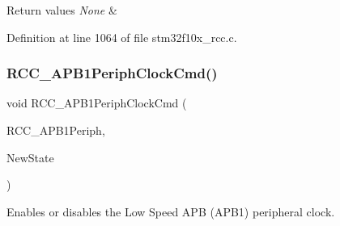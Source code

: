 \begin{DoxyRetVals}{Return values}
{\em None} & \\
\hline
\end{DoxyRetVals}


Definition at line 1064 of file stm32f10x\+\_\+rcc.\+c.

\mbox{\label{group___r_c_c___exported___functions_gaee7cc5d73af7fe1986fceff8afd3973e}} 
\subsubsection{\texorpdfstring{R\+C\+C\+\_\+\+A\+P\+B1\+Periph\+Clock\+Cmd()}{RCC\_APB1PeriphClockCmd()}}
{\footnotesize\ttfamily void R\+C\+C\+\_\+\+A\+P\+B1\+Periph\+Clock\+Cmd (\begin{DoxyParamCaption}\item[{uint32\+\_\+t}]{R\+C\+C\+\_\+\+A\+P\+B1\+Periph,  }\item[{\hyperlink{group___exported__types_gac9a7e9a35d2513ec15c3b537aaa4fba1}{Functional\+State}}]{New\+State }\end{DoxyParamCaption})}



Enables or disables the Low Speed A\+PB (A\+P\+B1) peripheral clock. 


